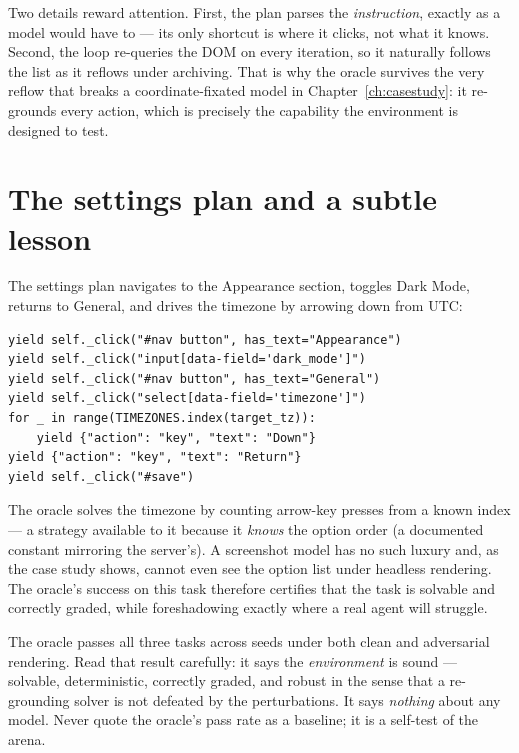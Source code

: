 \documentclass[11pt,openany]{book}
\newcommand{\code}[1]{\textcolor{clayd}{\texttt{\detokenize{#1}}}}
\begin{document}
Two details reward attention. First, the plan parses the \emph{instruction},
exactly as a model would have to — its only shortcut is where it clicks, not what
it knows. Second, the \code{while ... exists} loop re-queries the DOM on every
iteration, so it naturally follows the list as it reflows under archiving. That is
why the oracle survives the very reflow that breaks a coordinate-fixated model in
Chapter~\ref{ch:casestudy}: it re-grounds every action, which is precisely the
capability the environment is designed to test.

\section{The settings plan and a subtle lesson}

The settings plan navigates to the Appearance section, toggles Dark Mode, returns
to General, and drives the timezone \code{<select>} by arrowing down from UTC:

\begin{lstlisting}[style=py]
yield self._click("#nav button", has_text="Appearance")
yield self._click("input[data-field='dark_mode']")
yield self._click("#nav button", has_text="General")
yield self._click("select[data-field='timezone']")
for _ in range(TIMEZONES.index(target_tz)):
    yield {"action": "key", "text": "Down"}
yield {"action": "key", "text": "Return"}
yield self._click("#save")
\end{lstlisting}

The oracle solves the timezone by counting arrow-key presses from a known index —
a strategy available to it because it \emph{knows} the option order (a documented
constant mirroring the server's). A screenshot model has no such luxury and, as
the case study shows, cannot even see the option list under headless rendering.
The oracle's success on this task therefore certifies that the task is solvable
and correctly graded, while foreshadowing exactly where a real agent will
struggle.

\begin{notebox}[.\ ]
The oracle passes all three tasks across seeds under both clean and adversarial
rendering. Read that result carefully: it says the \emph{environment} is sound —
solvable, deterministic, correctly graded, and robust in the sense that a
re-grounding solver is not defeated by the perturbations. It says \emph{nothing}
about any model. Never quote the oracle's pass rate as a baseline; it is a
self-test of the arena.
\end{notebox}
\end{document}
